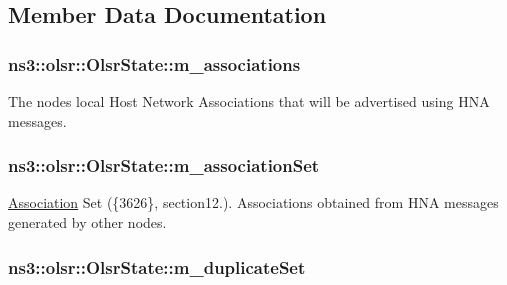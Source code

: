 \subsection{Member Data Documentation}
\subsubsection[{\texorpdfstring{m\+\_\+associations}{m_associations}}]{ ns3\+::olsr\+::\+Olsr\+State\+::m\+\_\+associations\hspace{0.3cm}{\ttfamily [protected]}}\hypertarget{classns3_1_1olsr_1_1OlsrState_a7af273b4e3d168740e314b4894caef6f}{}\label{classns3_1_1olsr_1_1OlsrState_a7af273b4e3d168740e314b4894caef6f}


The node\textquotesingle{}s local Host Network Associations that will be advertised using H\+NA messages. 

\subsubsection[{\texorpdfstring{m\+\_\+association\+Set}{m_associationSet}}]{ ns3\+::olsr\+::\+Olsr\+State\+::m\+\_\+association\+Set\hspace{0.3cm}{\ttfamily [protected]}}\hypertarget{classns3_1_1olsr_1_1OlsrState_a12b0716565d62abb059d75b67558a06c}{}\label{classns3_1_1olsr_1_1OlsrState_a12b0716565d62abb059d75b67558a06c}


\hyperlink{structns3_1_1olsr_1_1Association}{Association} Set (\{3626\}, section12.). Associations obtained from H\+NA messages generated by other nodes. 

\subsubsection[{\texorpdfstring{m\+\_\+duplicate\+Set}{m_duplicateSet}}]{ ns3\+::olsr\+::\+Olsr\+State\+::m\+\_\+duplicate\+Set\hspace{0.3cm}{\ttfamily [protected]}}\hypertarget{classns3_1_1olsr_1_1OlsrState_a6018482bbd79fb70432f35646f9e4b7a}{}\label{classns3_1_1olsr_1_1OlsrState_a6018482bbd79fb70432f35646f9e4b7a}


